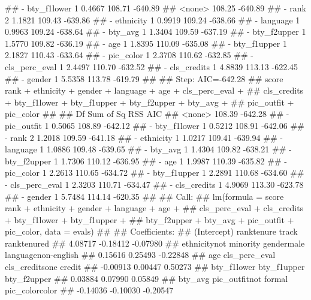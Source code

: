 \documentclass[]{article}
\newenvironment{Shaded}{\begin{snugshade}}{\end{snugshade}}
\newcommand{\NormalTok}[1]{#1}
\begin{document}
\begin{Shaded}
\begin{Highlighting}[]
\NormalTok{## - bty_f1lower    1    0.4667 108.71 -640.89}
\NormalTok{## <none>                       108.25 -640.89}
\NormalTok{## - rank           2    1.1821 109.43 -639.86}
\NormalTok{## - ethnicity      1    0.9919 109.24 -638.66}
\NormalTok{## - language       1    0.9963 109.24 -638.64}
\NormalTok{## - bty_avg        1    1.3404 109.59 -637.19}
\NormalTok{## - bty_f2upper    1    1.5770 109.82 -636.19}
\NormalTok{## - age            1    1.8395 110.09 -635.08}
\NormalTok{## - bty_f1upper    1    2.1827 110.43 -633.64}
\NormalTok{## - pic_color      1    2.3708 110.62 -632.85}
\NormalTok{## - cls_perc_eval  1    2.4497 110.70 -632.52}
\NormalTok{## - cls_credits    1    4.8839 113.13 -622.45}
\NormalTok{## - gender         1    5.5358 113.78 -619.79}
\NormalTok{## }
\NormalTok{## Step:  AIC=-642.28}
\NormalTok{## score ~ rank + ethnicity + gender + language + age + cls_perc_eval + }
\NormalTok{##     cls_credits + bty_f1lower + bty_f1upper + bty_f2upper + bty_avg + }
\NormalTok{##     pic_outfit + pic_color}
\NormalTok{## }
\NormalTok{##                 Df Sum of Sq    RSS     AIC}
\NormalTok{## <none>                       108.39 -642.28}
\NormalTok{## - pic_outfit     1    0.5065 108.89 -642.12}
\NormalTok{## - bty_f1lower    1    0.5212 108.91 -642.06}
\NormalTok{## - rank           2    1.2018 109.59 -641.18}
\NormalTok{## - ethnicity      1    1.0217 109.41 -639.94}
\NormalTok{## - language       1    1.0886 109.48 -639.65}
\NormalTok{## - bty_avg        1    1.4304 109.82 -638.21}
\NormalTok{## - bty_f2upper    1    1.7306 110.12 -636.95}
\NormalTok{## - age            1    1.9987 110.39 -635.82}
\NormalTok{## - pic_color      1    2.2613 110.65 -634.72}
\NormalTok{## - bty_f1upper    1    2.2891 110.68 -634.60}
\NormalTok{## - cls_perc_eval  1    2.3203 110.71 -634.47}
\NormalTok{## - cls_credits    1    4.9069 113.30 -623.78}
\NormalTok{## - gender         1    5.7484 114.14 -620.35}
\NormalTok{## }
\NormalTok{## Call:}
\NormalTok{## lm(formula = score ~ rank + ethnicity + gender + language + age + }
\NormalTok{##     cls_perc_eval + cls_credits + bty_f1lower + bty_f1upper + }
\NormalTok{##     bty_f2upper + bty_avg + pic_outfit + pic_color, data = evals)}
\NormalTok{## }
\NormalTok{## Coefficients:}
\NormalTok{##           (Intercept)       ranktenure track            ranktenured  }
\NormalTok{##               4.08717               -0.18412               -0.07980  }
\NormalTok{## ethnicitynot minority             gendermale    languagenon-english  }
\NormalTok{##               0.15616                0.25493               -0.22848  }
\NormalTok{##                   age          cls_perc_eval  cls_creditsone credit  }
\NormalTok{##              -0.00913                0.00447                0.50273  }
\NormalTok{##           bty_f1lower            bty_f1upper            bty_f2upper  }
\NormalTok{##               0.03884                0.07990                0.05849  }
\NormalTok{##               bty_avg   pic_outfitnot formal         pic_colorcolor  }
\NormalTok{##              -0.14036               -0.10030               -0.20547}
\end{Highlighting}
\end{Shaded}
\end{document}

